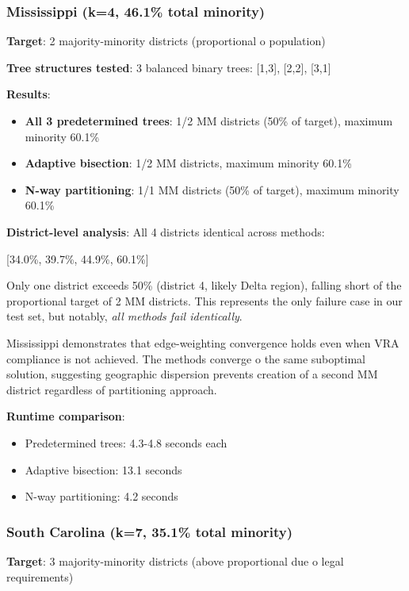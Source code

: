 \subsubsection{Mississippi (k=4, 46.1\% total minority)}

\textbf{Target}: 2 majority-minority districts (proportional 	o population)

\textbf{Tree structures tested}: 3 balanced binary trees: [1,3], [2,2], [3,1]

\textbf{Results}:
\begin{itemize}
\item \textbf{All 3 predetermined trees}: 1/2 MM districts (50\% of target), maximum minority 60.1\%
\item \textbf{Adaptive bisection}: 1/2 MM districts, maximum minority 60.1\%
\item \textbf{N-way partitioning}: 1/1 MM districts (50\% of target), maximum minority 60.1\%
\end{itemize}

\textbf{District-level analysis}: All 4 districts identical across methods:
\begin{center}
[34.0\%, 39.7\%, 44.9\%, 60.1\%]
\end{center}

Only one district exceeds 50\% (district 4, likely Delta region), falling short of the proportional target of 2 MM districts. This represents the only failure case in our test set, but notably, \textit{all methods fail identically}.

Mississippi demonstrates that edge-weighting convergence holds even when VRA compliance is not achieved. The methods converge 	o the same suboptimal solution, suggesting geographic dispersion prevents creation of a second MM district regardless of partitioning approach.

\textbf{Runtime comparison}:
\begin{itemize}
\item Predetermined trees: 4.3-4.8 seconds each
\item Adaptive bisection: 13.1 seconds
\item N-way partitioning: 4.2 seconds
\end{itemize}

\subsubsection{South Carolina (k=7, 35.1\% total minority)}

\textbf{Target}: 3 majority-minority districts (above proportional due 	o legal requirements)

